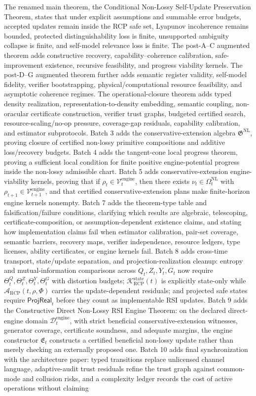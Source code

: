 \documentclass[11pt]{article}
\newcommand{\K}{\mathcal{K}}
\newcommand{\Acal}{\mathcal{A}}
\newcommand{\1}{\mathbf{1}}
\newcommand{\RCP}{\mathrm{RCP}}
\newcommand{\state}{\mathrm{state}}
\providecommand{\Dcal}{\mathcal{D}}
\providecommand{\Vcal}{\mathcal{V}}
\begin{document}
The renamed main theorem, the Conditional Non-Lossy Self-Update Preservation Theorem, states that under explicit assumptions and summable error budgets, accepted updates remain inside the RCP safe set, Lyapunov incoherence remains bounded, protected distinguishability loss is finite, unsupported ambiguity collapse is finite, and self-model relevance loss is finite. The post-A--C augmented theorem adds constructive recovery, capability--coherence calibration, safe-improvement existence, recursive feasibility, and progress viability kernels. The post-D--G augmented theorem further adds semantic register validity, self-model fidelity, verifier bootstrapping, physical/computational resource feasibility, and asymptotic coherence regimes. The operational-closure theorem adds typed density realization, representation-to-density embedding, semantic coupling, non-oracular certificate construction, verifier trust graphs, budgeted certified search, resource-scaling/no-op pressure, coverage-gap residuals, capability calibration, and estimator subprotocols. Batch 3 adds the conservative-extension algebra \(\mathfrak G^{\mathrm{NL}}\), proving closure of certified non-lossy primitive compositions and additive loss/recovery budgets. Batch 4 adds the tangent-cone local progress theorem, proving a sufficient local condition for finite positive engine-potential progress inside the non-lossy admissible chart. Batch 5 adds conservative-extension engine-viability kernels, proving that if \(\rho_t\in\Vcal_t^{\mathrm{engine}}\), then there exists \(\nu_t\in\Omega_t^{\mathrm{NL}}\) with \(\rho_{t+1}\in\Vcal_{t+1}^{\mathrm{engine}}\), and that certified conservative-extension plans make finite-horizon engine kernels nonempty. Batch 7 adds the theorem-type table and falsification/failure conditions, clarifying which results are algebraic, telescoping, certificate-composition, or assumption-dependent existence claims, and stating how implementation claims fail when estimator calibration, pair-set coverage, semantic barriers, recovery maps, verifier independence, resource ledgers, type licenses, ability certificates, or engine kernels fail. Batch 8 adds cross-time transport, state/update separation, and projection-realization cleanup: entropy and mutual-information comparisons across \(Q_t,Z_t,Y_t,G_t\) now require \(\Theta_t^Q,\Theta_t^Z,\Theta_t^Y,\Theta_t^G\) with distortion budgets; \(\K_{\RCP}^{\state}(t)\) is explicitly state-only while \(\Acal_{\RCP}(t,\rho,\Phi)\) carries the update-dependent residuals; and projected safe states require \(\mathsf{ProjReal}_t\) before they count as implementable RSI updates. Batch 9 adds the Constructive Direct Non-Lossy RSI Engine Theorem: on the declared direct-engine domain \(\Dcal_t^{\mathrm{engine}}\), with strict beneficial conservative-extension witnesses, generator coverage, certificate soundness, and adequate margins, the engine constructor \(\mathfrak E_t\) constructs a certified beneficial non-lossy update rather than merely checking an externally proposed one. Batch 10 adds final synchronization with the architecture paper: typed transitions replace unlicensed channel language, adaptive-audit trust residuals refine the trust graph against common-mode and collusion risks, and a complexity ledger records the cost of active operations without claiming 
\end{document}
